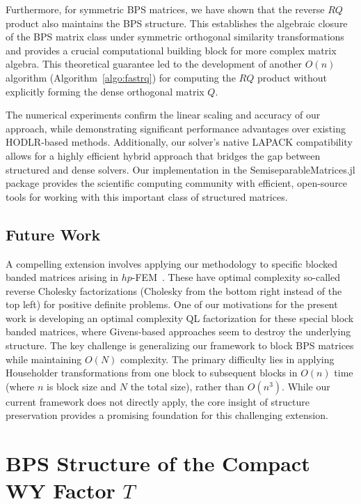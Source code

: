 \documentclass[a4paper,fleqn]{cas-sc}
\begin{document}
Furthermore, for symmetric BPS matrices, we have shown that the reverse $RQ$ product also maintains the BPS structure. This establishes the algebraic closure of the BPS matrix class under symmetric orthogonal similarity transformations and provides a crucial computational building block for more complex matrix algebra. This theoretical guarantee led to the development of another $O(n)$ algorithm (Algorithm~\ref{algo:fastrq}) for computing the $RQ$ product without explicitly forming the dense orthogonal matrix $Q$.

The numerical experiments confirm the linear scaling and accuracy of our approach, while demonstrating significant performance advantages over existing HODLR-based methods. Additionally, our solver's native LAPACK compatibility allows for a highly efficient hybrid approach that bridges the gap between structured and dense solvers. Our implementation in the SemiseparableMatrices.jl package provides the scientific computing community with efficient, open-source tools for working with this important class of structured matrices.

\subsection*{Future Work}


A compelling extension involves applying our methodology to specific blocked banded matrices arising in $hp$-FEM~\citep{knook2024quasi}. These have optimal complexity so-called reverse Cholesky factorizations (Cholesky from the bottom right instead of the top left) for positive definite problems. One of our motivations for the present work is developing an optimal complexity QL factorization for these special block banded matrices, where Givens-based approaches seem to destroy the underlying structure.  The key challenge is generalizing our framework to block BPS matrices while maintaining $O(N)$ complexity. The primary difficulty lies in applying Householder transformations from one block to subsequent blocks in $O(n)$ time (where $n$ is block size and $N$ the total size), rather than $O(n^3)$. While our current framework does not directly apply, the core insight of structure preservation provides a promising foundation for this challenging extension.








\appendix
\section{BPS Structure of the Compact WY Factor $T$}
\label{sec:bps_T}
\end{document}
